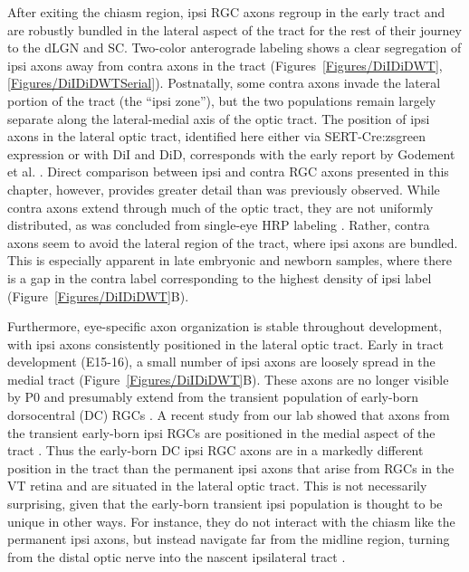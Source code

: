 After exiting the chiasm region, ipsi RGC axons regroup in the early tract and are robustly bundled in the lateral aspect of the tract for the rest of their journey to the dLGN and SC.
Two-color anterograde labeling shows a clear segregation of ipsi axons away from contra axons in the tract (Figures~\ref{Figures/DiIDiDWT}, \ref{Figures/DiIDiDWTSerial}).
Postnatally, some contra axons invade the lateral portion of the tract (the ``ipsi zone''), but the two populations remain largely separate along the lateral-medial axis of the optic tract.
The position of ipsi axons in the lateral optic tract, identified here either via SERT-Cre:zsgreen expression or with DiI and DiD, corresponds with the early report by Godement et al. .
Direct comparison between ipsi and contra RGC axons presented in this chapter, however, provides greater detail than was previously observed.
While contra axons extend through much of the optic tract, they are not uniformly distributed, as was concluded from single-eye HRP labeling \cite{godement1984prenatal}.
Rather, contra axons seem to avoid the lateral region of the tract, where ipsi axons are bundled.
This is especially apparent in late embryonic and newborn samples, where there is a gap in the contra label corresponding to the highest density of ipsi label (Figure~\ref{Figures/DiIDiDWT}B).

Furthermore, eye-specific axon organization is stable throughout development, with ipsi axons consistently positioned in the lateral optic tract.
Early in tract development (E15-16), a small number of ipsi axons are loosely spread in the medial tract (Figure~\ref{Figures/DiIDiDWT}B).
These axons are no longer visible by P0 and presumably extend from the transient population of early-born dorsocentral (DC) RGCs \cite{drager1985birth,soares2015transient}.
A recent study from our lab showed that axons from the transient early-born ipsi RGCs are positioned in the medial aspect of the tract \cite{soares2015transient}.
Thus the early-born DC ipsi RGC axons are in a markedly different position in the tract than the permanent ipsi axons that arise from RGCs in the VT retina and are situated in the lateral optic tract.
This is not necessarily surprising, given that the early-born transient ipsi population is thought to be unique in other ways.
For instance, they do not interact with the chiasm like the permanent ipsi axons, but instead navigate far from the midline region, turning from the distal optic nerve into the nascent ipsilateral tract \cite{godement1987study,godement1990retinal,marcus1995first}.

